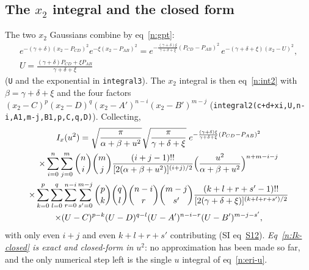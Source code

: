 \documentclass[11pt]{article}
\begin{document}
\subsection{The $x_2$ integral and the closed form}
The two $x_2$ Gaussians combine by eq~\ref{n:gpt}:
\begin{equation}
\begin{gathered}
e^{-(\gamma+\delta)(x_2-P_{CD})^2}e^{-\xi(x_2-P_{AB})^2}
=e^{-\frac{(\gamma+\delta)\xi}{\gamma+\delta+\xi}(P_{CD}-P_{AB})^2}\,e^{-(\gamma+\delta+\xi)(x_2-U)^2},\\
U=\frac{(\gamma+\delta)P_{CD}+\xi P_{AB}}{\gamma+\delta+\xi}
\end{gathered}
\label{n:x2}
\end{equation}
(\texttt{U} and the exponential in \texttt{integral3}).  The $x_2$ integral is then eq~\ref{n:int2} with
$\beta=\gamma+\delta+\xi$ and the four factors $(x_2-C)^p(x_2-D)^q(x_2-A')^{n-i}(x_2-B')^{m-j}$
(\texttt{integral2(c+d+xi,U,n-i,A1,m-j,B1,p,C,q,D)}).  Collecting,
\begin{multline}
I_x(u^2)=\sqrt{\frac{\pi}{\alpha+\beta+u^2}}\sqrt{\frac{\pi}{\gamma+\delta+\xi}}\;
e^{-\frac{(\gamma+\delta)\xi}{\gamma+\delta+\xi}(P_{CD}-P_{AB})^2}\\
\times\sum_{i=0}^{n}\sum_{j=0}^{m}\binom ni\binom mj\frac{(i+j-1)!!}{[2(\alpha+\beta+u^2)]^{(i+j)/2}}
\Bigl(\frac{u^2}{\alpha+\beta+u^2}\Bigr)^{n+m-i-j}\\
\times\sum_{k=0}^{p}\sum_{l=0}^{q}\sum_{r=0}^{n-i}\sum_{s'=0}^{m-j}
\binom pk\binom ql\binom{n-i}{r}\binom{m-j}{s'}
\frac{(k+l+r+s'-1)!!}{[2(\gamma+\delta+\xi)]^{(k+l+r+s')/2}}\\
\times(U-C)^{p-k}(U-D)^{q-l}(U-A')^{n-i-r}(U-B')^{m-j-s'},
\label{n:Ik-closed}
\end{multline}
with only even $i+j$ and even $k+l+r+s'$ contributing (SI eq~\href{si.pdf\#equation.12}{S12}).
\emph{Eq~\ref{n:Ik-closed} is exact and closed-form in $u^2$}: no approximation has been made so far, and
the only numerical step left is the single $u$ integral of eq~\ref{n:eri-u}.
\end{document}
